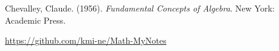 \documentclass[autodetect-engine, ja=standard, base=9pt, b5j, english]{bxjsreport}
\begin{document}
Chevalley, Claude. (1956). \textit{Fundamental Concepts of Algebra}. New York: Academic Press.

\url{https://github.com/kmi-ne/Math-MyNotes}


\end{document}
